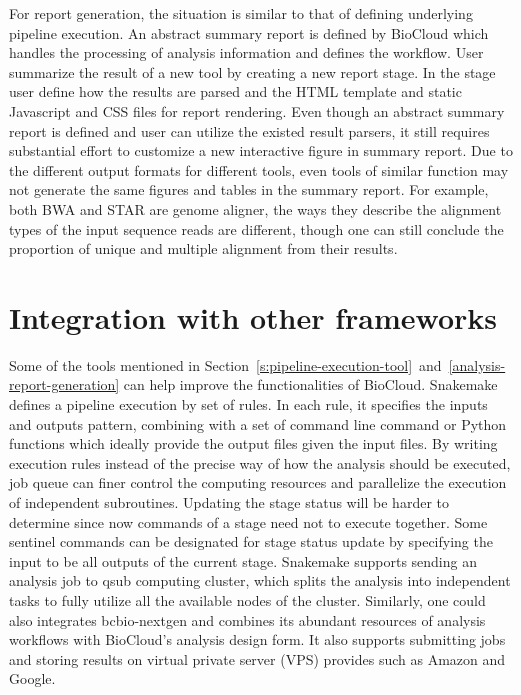 For report generation, the situation is similar to that of defining underlying
pipeline execution. An abstract summary report is defined by BioCloud which
handles the processing of analysis information and defines the workflow. User
summarize the result of a new tool by creating a new report stage. In the stage
user define how the results are parsed and the HTML template and static
Javascript and CSS files for report rendering. Even though an abstract summary
report is defined and user can utilize the existed result parsers, it still
requires substantial effort to customize a new interactive figure in summary
report. Due to the different output formats for different tools, even tools of
similar function may not generate the same figures and tables in the summary
report. For example, both BWA and STAR are genome aligner, the ways they
describe the alignment types of the input sequence reads are different, though
one can still conclude the proportion of unique and multiple alignment from
their results.



\section{Integration with other frameworks}

Some of the tools mentioned in
Section~\ref{s:pipeline-execution-tool}~and~\ref{analysis-report-generation}
can help improve the functionalities of BioCloud. Snakemake
\cite{koster2012:snakemakea} defines a pipeline execution by set of rules. In
each rule, it specifies the inputs and outputs pattern, combining with a set of
command line command or Python functions which ideally provide the output files
given the input files. By writing execution rules instead of the precise way of
how the analysis should be executed, job queue can finer control the computing
resources and parallelize the execution of independent subroutines. Updating
the stage status will be harder to determine since now commands of a stage need
not to execute together. Some sentinel commands can be designated for stage
status update by specifying the input to be all outputs of the current stage.
Snakemake supports sending an analysis job to qsub computing cluster, which
splits the analysis into independent tasks to fully utilize all the available
nodes of the cluster. Similarly, one could also integrates bcbio-nextgen
\cite{:bcbionextgen,guimera2012:bcbionextgen} and combines its abundant
resources of analysis workflows with BioCloud's analysis design form. It also
supports submitting jobs and storing results on virtual private server (VPS)
provides such as Amazon and Google.

